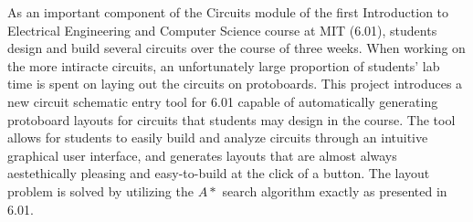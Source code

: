% 
% 
%

As an important component of the Circuits module of the first Introduction to
Electrical Engineering and Computer Science course at MIT (6.01), students
design and
build several circuits over the course of three weeks. When working on the
more intiracte circuits, an unfortunately large proportion of students' lab time
is spent on laying out the circuits on protoboards. This project introduces a
new circuit schematic entry tool for 6.01 capable of automatically generating
protoboard layouts for circuits that students may design in the course. The tool
allows for students to easily build and analyze circuits through an intuitive
graphical user interface, and generates layouts that are almost always
aestethically pleasing and easy-to-build at the click of a button. The layout
problem is solved by utilizing the $A*$ search algorithm exactly as presented in
6.01.
